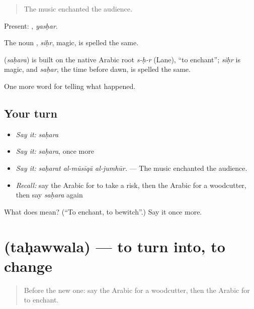 \begin{quote}
The music enchanted the audience.
\end{quote}

Present: , \emph{yasḥar}.

The noun , \emph{siḥr}, magic, is spelled the same.

\begin{cousinweb}
\textbf{} (\emph{saḥara}) is built on the native Arabic root \emph{s-ḥ-r} (Lane), \textquotedblleft{}to enchant\textquotedblright{}; \emph{siḥr} is magic, and \emph{saḥar}, the time before dawn, is spelled the same.
\end{cousinweb}

\begin{grammarlens}[title={What you've built}]
One more word for telling what happened.
\end{grammarlens}

\subsection*{Your turn}
\begin{itemize}
\raggedright
  \item \emph{Say it:} \emph{saḥara}
  \item \emph{Say it:} \emph{saḥara}, once more
  \item \emph{Say it:} \emph{saḥarat al-mūsīqā al-jumhūr.} — The music enchanted the audience.
  \item \emph{Recall:} say the Arabic for to take a risk, then the Arabic for a woodcutter, then say \emph{saḥara} again
\end{itemize}

\begin{tcolorbox}[breakable,colback=teal!4,colframe=teal!35!black,title={Before you move on}]
What does  mean? (\textquotedblleft{}To enchant, to bewitch\textquotedblright{}.) Say it once more.
\end{tcolorbox}
\section[\texorpdfstring{\ar{تحول} (taḥawwala)}{تحول (taḥawwala)}]{ (taḥawwala) — to turn into, to change}

\label{lesson:AR-C344-tahawwala}



\begin{quote}
Before the new one: say the Arabic for a woodcutter, then the Arabic for to enchant.
\end{quote}

